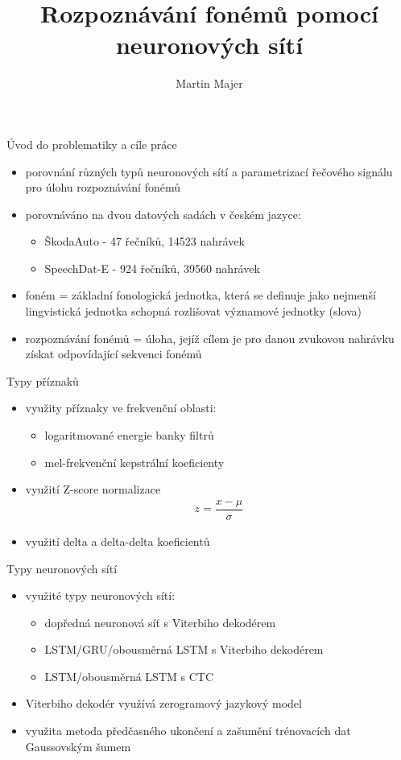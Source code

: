 \documentclass[10pt]{beamer}
\title{Rozpoznávání fonémů pomocí neuronových sítí}
\author{Martin Majer}
\date{}
\institute{Katedra kybernetiky\\Fakulta aplikovaných věd\\ Západočeská univerzita v Plzni}
\begin{document}
\maketitle

\begin{frame}{Úvod do problematiky a cíle práce}
	\begin{itemize}
		\item porovnání různých typů neuronových sítí a parametrizací řečového signálu pro úlohu rozpoznávání fonémů		
		\item porovnáváno na dvou datových sadách v českém jazyce:
			\begin{itemize}
				\item ŠkodaAuto - 47 řečníků, 14523 nahrávek
				\item SpeechDat-E - 924 řečníků, 39560 nahrávek
			\end{itemize}
		\item foném = základní fonologická jednotka, která se definuje jako nejmenší lingvistická jednotka schopná rozlišovat významové jednotky (slova)
		\item rozpoznávání fonémů = úloha, jejíž cílem je pro danou zvukovou nahrávku získat odpovídající sekvenci fonémů
	\end{itemize}
\end{frame}

\begin{frame}{Typy příznaků}
	\begin{itemize}
		\item využity příznaky ve frekvenční oblasti:
			\begin{itemize}
				\item logaritmované energie banky filtrů
				\item mel-frekvenční kepstrální koeficienty
			\end{itemize}
		\item využití Z-score normalizace
			\begin{align*}
				z = \dfrac{x - \mu}{\sigma}
			\end{align*}
		\item využití delta a delta-delta koeficientů
	\end{itemize}
\end{frame}

\begin{frame}{Typy neuronových sítí}
	\begin{itemize}
		\item využité typy neuronových sítí:
			\begin{itemize}
				\item dopředná neuronová síť s Viterbiho dekodérem
				\item LSTM/GRU/obousměrná LSTM s Viterbiho dekodérem
				\item LSTM/obousměrná LSTM s CTC
			\end{itemize}
		\item Viterbiho dekodér využívá zerogramový jazykový model
		\item využita metoda předčasného ukončení a zašumění trénovacích dat Gaussovským šumem
	\end{itemize}
\end{frame}
\end{document}
